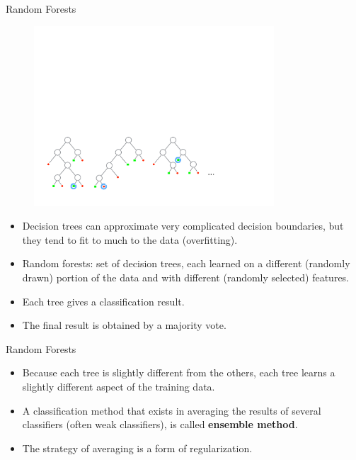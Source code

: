 \documentclass[xcolor=pdftex,dvipsnames,table]{beamer}
\begin{document}
\begin{frame}{Random Forests}
\begin{figure}[htb]
\includegraphics[width=0.8\textwidth]{../graphics/Forest.pdf}
\end{figure}

\begin{itemize}
	\item Decision trees can approximate very complicated decision boundaries, but they tend to fit to much to the data (overfitting). 
	\item Random forests: set of decision trees, each learned on a different (randomly drawn) portion of the data and with different (randomly selected) features. 
	\item Each tree gives a classification result. 
	\item The final result is obtained by a majority vote. 
\end{itemize}
	
\end{frame}

\begin{frame}{Random Forests}

\begin{itemize}
	\item Because each tree is slightly different from the others, each tree learns a slightly different aspect of the training data. 
	\item A classification method that exists in averaging the results of several classifiers (often weak classifiers), is called {\bf ensemble method}. 
	\item The strategy of averaging is a form of regularization. 
\end{itemize}
	
\end{frame}
\end{document}
